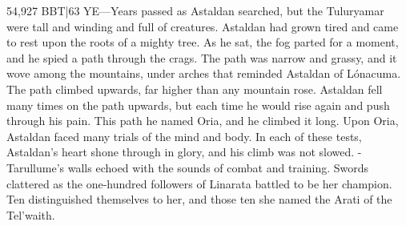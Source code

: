 \documentclass[smalldemyvopaper,11pt,twoside,onecolumn,openright,extrafontsizes]{memoir}
\begin{document}
54,927 BBT|63 YE—Years passed as Astaldan searched, but the Tuluryamar were tall and winding and full of creatures. Astaldan had grown tired and came to rest upon the roots of a mighty tree. As he sat, the fog parted for a moment, and he spied a path through the crags. The path was narrow and grassy, and it wove among the mountains, under arches that reminded Astaldan of Lónacuma. The path climbed upwards, far higher than any mountain rose. Astaldan fell many times on the path upwards, but each time he would rise again and push through his pain. This path he named Oria, and he climbed it long. Upon Oria, Astaldan faced many trials of the mind and body. In each of these tests, Astaldan’s heart shone through in glory, and his climb was not slowed.
-Tarullume’s walls echoed with the sounds of combat and training. Swords clattered as the one-hundred followers of Linarata battled to be her champion. Ten distinguished themselves to her, and those ten she named the Arati of the Tel’waith.
\end{document}
